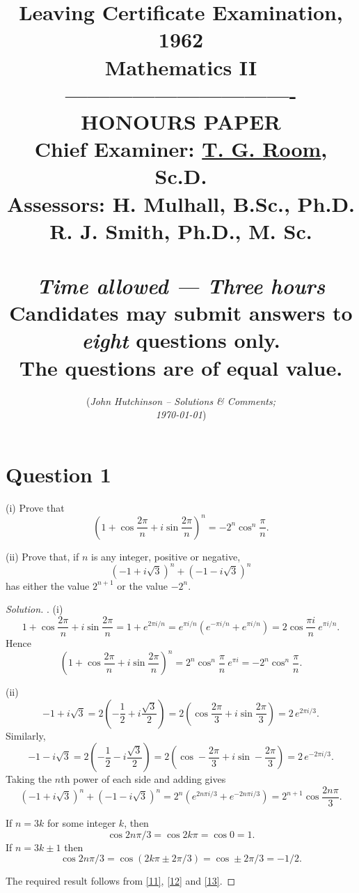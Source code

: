 \documentclass[11pt,a4paper]{report}
\title{Leaving Certificate Examination, 1962\\
Mathematics II\\ 
-------------------------------\\
HONOURS PAPER\\
Chief Examiner: \href{https://en.wikipedia.org/wiki/Thomas_Gerald_Room}{T. G. Room}, Sc.D.\\
Assessors: H. Mulhall, B.Sc., Ph.D.\\
R. J. Smith, Ph.D., M. Sc.\\
\mbox{}\\
\emph{Time allowed --- Three hours}\\ 
Candidates may submit answers to \emph{eight} questions only.\\
The questions are of equal value.
}
\date{(\emph{John Hutchinson -- Solutions \& Comments;\\
\today})}
\theoremstyle{plain}
\theoremstyle{definition}
\begin{document}
\maketitle
\section*{Question 1}

(i) Prove that 
\[
\left( 1 + \cos \frac{2\pi}{n} + i \sin \frac{2\pi}{n} \right) ^n = -2^n \cos^n \frac{\pi}{n}.
\]

\noindent (ii) Prove that, if $ n $ is any integer, positive or negative,
\[
\left(-1+i \sqrt{3}\right)^n + \left(-1 -i \sqrt{3}\right)^n 
\]
has either the value $ 2^{n+1} $ or the value $ - 2^n $.


\bigskip


\begin{proof}[Solution]
\mbox{}
\bigskip

. (i)  
\[
 1 + \cos \frac{2\pi}{n} + i \sin \frac{2\pi}{n}  = 1 + e^{2\pi i/n} = e^{\pi i/n} \left(  e^{-\pi i/n} +  e^{\pi i/n} \right) = 2 \cos\frac{\pi i}{n}\ e^{\pi i/n} .
 \]
Hence
\[
\left( 1 + \cos \frac{2\pi}{n} + i \sin \frac{2\pi}{n} \right) ^n =  2^n \cos^n \frac{\pi}{n} \ e^{\pi i } = -2^n \cos^n \frac{\pi}{n}.
\]

\bigskip
\noindent \phantom{1. }(ii) 
\[
-1 + i \sqrt{3} = 2\left(-\frac{1}{2} + i \frac{\sqrt{3}}{2} \right) = 2 \left( \cos \frac{2\pi}{3} + i \sin \frac{2 \pi}{3} \right) = 2\, e^{2\pi i/3} .
\]
Similarly,
\[
-1 - i \sqrt{3} = 2\left(-\frac{1}{2} - i \frac{\sqrt{3}}{2} \right) = 2 \left( \cos -\frac{2\pi}{3} + i \sin -\frac{2 \pi}{3} \right) = 2\, e^{-2\pi i/3} .
\]
Taking the $ n $th power of each side and adding gives 
\begin{equation} \label{11} 
\left(-1+i \sqrt{3}\right)^n + \left(-1 -i \sqrt{3}\right)^n = 2^n \left( e^{2n\pi i/3} + e^{-2n\pi i/3} \right) = 2^{n+1} \cos \frac{2n\pi}{3}.
\end{equation} 

If $ n =3k$ for some integer $ k $, then 
\begin{equation} \label{12} 
 \cos 2n\pi/3 = \cos 2k\pi = \cos 0 = 1 .
\end{equation} 
  If $ n = 3k \pm 1 $ then 
\begin{equation} \label{13} 
 \cos 2n\pi/3 = \cos (2k\pi \pm 2\pi/3 )= \cos \pm 2\pi/3= -1/2 .
\end{equation} 

The required result follows from \eqref{11}, \eqref{12} and \eqref{13}.
\end{proof} 
\end{document}
